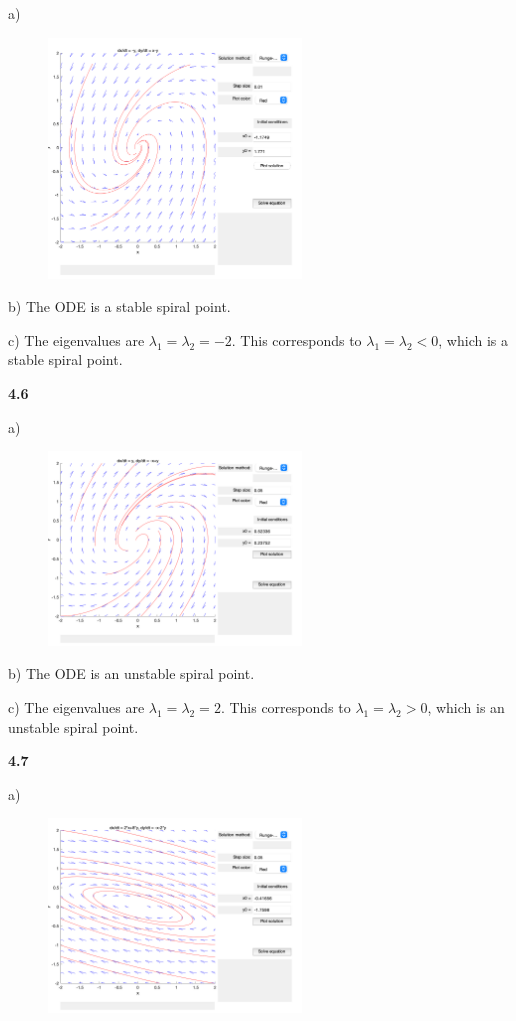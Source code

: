 \documentclass[12pt]{article}
\begin{document}
a)\begin{figure}[H]
    \centering
    \includegraphics[width=0.6\textwidth]{images/4.5.png}
\end{figure}

b) The ODE is a stable spiral point.

c) The eigenvalues are $\lambda_1 = \lambda_2 = -2$. This corresponds to $\lambda_1 = \lambda_2 < 0$, which is a stable spiral point.

\textbf{4.6}

a) \begin{figure}[H]
    \centering
    \includegraphics[width=0.6\textwidth]{images/4.6.png}
\end{figure}

b) The ODE is an unstable spiral point.

c) The eigenvalues are $\lambda_1 = \lambda_2 = 2$. This corresponds to $\lambda_1 = \lambda_2 > 0$, which is an unstable spiral point.

\textbf{4.7}

a) \begin{figure}[H]
    \centering
    \includegraphics[width=0.6\textwidth]{images/4.7.png}
\end{figure}
\end{document}
